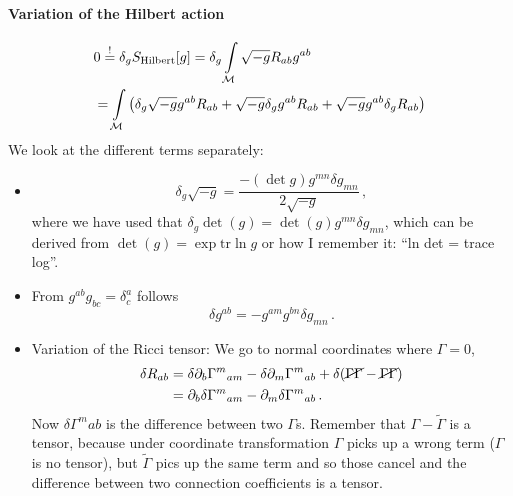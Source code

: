 \paragraph{Variation of the Hilbert action}
\begin{align*}
    &0 \stackrel{!}{=} \delta_g S_\text{Hilbert}[g] = \delta_g \int\limits_{\mathcal{M}} \sqrt{-g} R_{ab}g^{ab}\\
    &= \int\limits_{\mathcal{M}} \left( \delta_g\sqrt{-g} g^{ab} R_{ab} + \sqrt{-g} \delta_g g^{ab} R_{ab}
    + \sqrt{-g} g^{ab} \delta_g R_{ab}\right)
\end{align*}
We look at the different terms separately:
\begin{itemize}
    \item 
        \begin{equation}
            \delta_g\sqrt{-g} = \frac{- (\det g) g^{mn}\delta g_{mn}}{2 \sqrt{-g}}\,,
        \end{equation}
        where we have used that $\delta_g \det(g) = \det(g) g^{mn}\delta g_{mn}$,
        which can be derived from $\det(g) = \exp \mathrm{tr} \ln g$ or how I remember it:
        ``ln det = trace log''.
    \item 
        From $g^{ab}g_{bc} = \delta^a_c$ follows
        \begin{equation}
            \delta g^{ab} = - g^{am} g^{bn} \delta g_{mn}\,.
        \end{equation}
    \item Variation of the Ricci tensor:
        We go to normal coordinates where $\Gamma = 0$,
        \begin{align*}
            \delta R_{ab} &= \delta \partial_b \Gamma^m{}_{am} -
            \delta \partial_m \Gamma^m{}_{ab} + \delta(\cancel{\Gamma\Gamma} - \cancel{\Gamma\Gamma})\\
            &= \partial_b \delta \Gamma^{m}{}_{am} - \partial_m \delta \Gamma^m{}_{ab}\,.
        \end{align*}
        Now $\delta \Gamma^m{ab}$ is the difference between two $\Gamma$s.
        Remember that $\Gamma - \tilde{\Gamma}$ is a tensor, because under coordinate transformation
        $\Gamma$ picks up a wrong term ($\Gamma$ is no tensor),
        but $\tilde\Gamma$ pics up the same term and so those cancel and the difference between
        two connection coefficients is a tensor.


\end{itemize}
